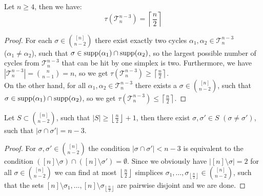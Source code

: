 \begin{lem}\label{lemma12}
Let \(n\geq 4\), then we have:
\[
\tau(\mathcal{T}_n^{n-3})=\left\lceil\frac{n}{2}\right\rceil
\]
\begin{proof}
For each \(\sigma\in\binom{[n]}{n-2}\) there exist exactly two cycles \(\alpha_1,\alpha_2\in\mathcal{T}_n^{n-3}\)\\
(\(\alpha_1\neq\alpha_2\)), such that \(\sigma\in \mathrm{supp}(\alpha_1)\cap \mathrm{supp}(\alpha_2)\), so the largest possible number of cycles from \(\mathcal{T}_n^{n-3}\) that can be hit by one simplex is two. Furthermore, we have \(\left|\mathcal{T}_n^{n-3}\right|=\binom{n}{n-1}=n\), so we get \(\tau(\mathcal{T}_n^{n-3})\geq\left\lceil\frac{n}{2}\right\rceil\).\\
On the other hand, for all \(\alpha_1,\alpha_2\in\mathcal{T}_n^{n-3}\) there exists a \(\sigma\in\binom{[n]}{n-2}\), such that\\
\(\sigma\in \mathrm{supp}(\alpha_1)\cap \mathrm{supp}(\alpha_2)\), so we get \(\tau(\mathcal{T}_n^{n-3})\leq\left\lceil\frac{n}{2}\right\rceil\).
\end{proof}
\end{lem}

\begin{lem}\label{lemma13}
Let \(S\subset\binom{[n]}{n-2}\), such that \(\left|S\right|\geq\left\lfloor\frac{n}{2}\right\rfloor+1\), then there exist \(\sigma,\sigma'\in S\) \((\sigma\neq\sigma')\), such that \(\left|\sigma\cap\sigma'\right|=n-3\).
\begin{proof}
For \(\sigma,\sigma'\in\binom{[n]}{n-2}\) the condition \(\left|\sigma\cap\sigma'\right|<n-3\) is equivalent to the condition \(([n]\setminus\sigma)\cap([n]\setminus\sigma')=\emptyset\). Since we obviously have \(\left|[n]\setminus\sigma\right|=2\) for all \(\sigma\in\binom{[n]}{n-2}\) we can find at most \(\left\lfloor\frac{n}{2}\right\rfloor\) simplices \(\sigma_1,\ldots,\sigma_{\left\lfloor\frac{n}{2}\right\rfloor}\in\binom{[n]}{n-2}\), such that the sets \([n]\setminus\sigma_1,\ldots,[n]\setminus\sigma_{\left\lfloor\frac{n}{2}\right\rfloor}\) are pairwise disjoint and we are done.
\end{proof}
\end{lem}

